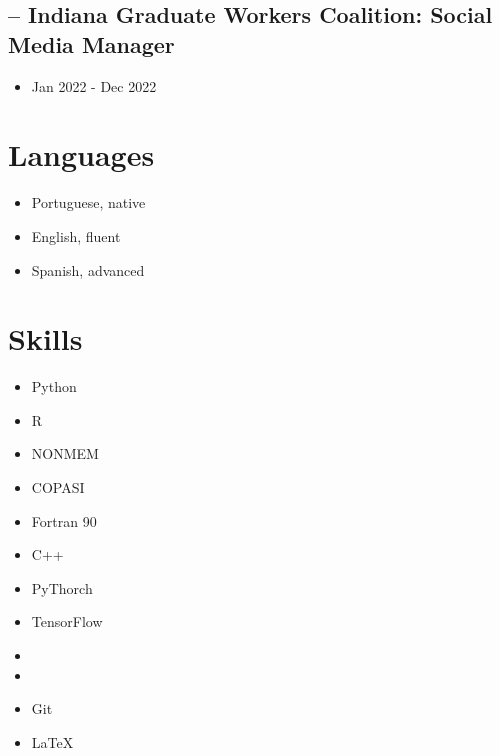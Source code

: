 \subsection*{-- Indiana Graduate Workers Coalition: Social Media Manager}
\begin{itemize}\setlength\itemsep{-.9em}
    \item Jan 2022 - Dec 2022
\end{itemize}

\section*{Languages}
\begin{itemize}\setlength\itemsep{-.9em}
    \item Portuguese, native
    \item English, fluent
    \item Spanish, advanced
\end{itemize}

\section*{Skills}
\begin{multicols}{3}
\begin{itemize}\setlength\itemsep{-.9em}
    \item Python
    \item R
    \item NONMEM
    \item COPASI
    \item Fortran 90
    \item C++
    \item PyThorch
    \item TensorFlow
    \item \ccds
    \item \pscs
    \item Git
    \item \LaTeX
\end{itemize}
\end{multicols}


